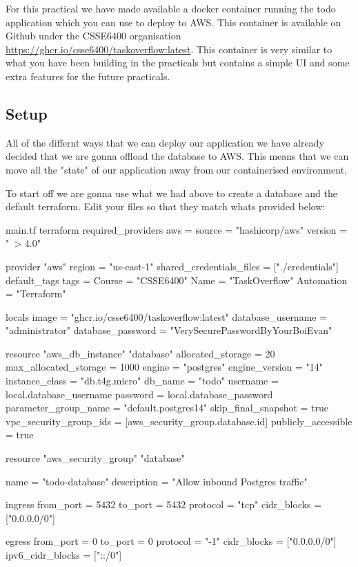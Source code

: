 \documentclass{csse4400}
\begin{document}
For this practical we have made available a docker container running the todo application which you can use to deploy to AWS. This container is available on Github under the CSSE6400 organisation \url{https://ghcr.io/csse6400/taskoverflow:latest}. This container is very similar to what you have been building in the practicals but contains a simple UI and some extra features for the future practicals.

\subsection{Setup}

All of the differnt ways that we can deploy our application we have already decided that we are gonna offload the database to AWS. This means that we can move all the "state" of our application away from our containerised environment.

To start off we are gonna use what we had above to create a database and the default terraform. Edit your files so that they match whats provided below:

\begin{code}[language=terraform,numbers=none]{main.tf}
  terraform {
    required_providers {
        aws = {
            source  = "hashicorp/aws"
            version = "~> 4.0"
        }
    }
}

provider "aws" {
    region = "us-east-1"
    shared_credentials_files = ["./credentials"]
    default_tags {
        tags = {
            Course       = "CSSE6400"
            Name         = "TaskOverflow"
            Automation   = "Terraform"
        }
    }
}

locals {
    image             = "ghcr.io/csse6400/taskoverflow:latest"
    database_username = "administrator"
    database_password = "VerySecurePasswordByYourBoiEvan"
}

resource "aws_db_instance" "database" {
  allocated_storage      = 20
  max_allocated_storage  = 1000
  engine                 = "postgres"
  engine_version         = "14"
  instance_class         = "db.t4g.micro"
  db_name                = "todo"
  username               = local.database_username
  password               = local.database_password
  parameter_group_name   = "default.postgres14"
  skip_final_snapshot    = true
  vpc_security_group_ids = [aws_security_group.database.id]
  publicly_accessible    = true
}

resource "aws_security_group" "database" {
  name        = "todo-database"
  description = "Allow inbound Postgres traffic"

  ingress {
    from_port        = 5432
    to_port          = 5432
    protocol         = "tcp"
    cidr_blocks      = ["0.0.0.0/0"]
  }

  egress {
    from_port        = 0
    to_port          = 0
    protocol         = "-1"
    cidr_blocks      = ["0.0.0.0/0"]
    ipv6_cidr_blocks = ["::/0"]
  }
}
\end{code}
\end{document}
